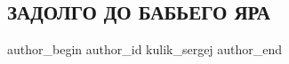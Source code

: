  
 
 
 
 
 
\subsection{ЗАДОЛГО ДО БАБЬЕГО ЯРА}
\label{sec:05_10_2021.fb.kulik_sergej.1.ukr_nacionalizm_evrei_1918_pogrom}
 
\ifcmt
 author_begin
   author_id kulik_sergej
 author_end
\fi

